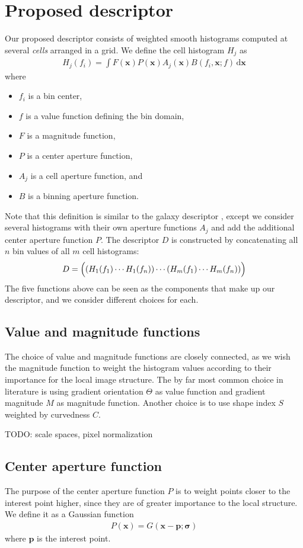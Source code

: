 \documentclass[thesis.tex]{subfiles}
\def\x{\mathbf{x}}
\def\p{\mathbf{p}}
\begin{document}
\chapter{Proposed descriptor}
%
Our proposed descriptor consists of weighted smooth histograms computed at several \textit{cells} arranged in a grid. We define the cell histogram $H_j$ as
%
\begin{align}
H_j(f_i) = \int F(\x) P (\x) A_j (\x) B(f_i, \x; f) \,\text{d} \x
\end{align}
%
where
%
\begin{itemize}
\item[] $f_i$ is a bin center,
\item[] $f$ is a value function defining the bin domain,
\item[] $F$ is a magnitude function,
\item[] $P$ is a center aperture function,
\item[] $A_j$ is a cell aperture function, and
\item[] $B$ is a binning aperture function.
\end{itemize}
%
Note that this definition is similar to the galaxy descriptor \cite{pedersen2013shape}, except we consider several histograms with their own aperture functions $A_j$ and add the additional center aperture function $P$. The descriptor $D$ is constructed by concatenating all $n$ bin values of all $m$ cell histograms:
%
\begin{align}
D = \Bigl( \left(H_1(f_1) \cdots H_1(f_n)\right) \cdots (H_m(f_1) \cdots H_m(f_n)) \Bigr)
\end{align}
%
The five functions above can be seen as the components that make up our descriptor, and we consider different choices for each.
%
\section{Value and magnitude functions}
%
The choice of value and magnitude functions are closely connected, as we wish the magnitude function to weight the histogram values according to their importance for the local image structure. The by far most common choice in literature is using gradient orientation $\Theta$ as value function and gradient magnitude $M$ as magnitude function. Another choice is to use shape index $S$ weighted by curvedness $C$.

TODO: scale spaces, pixel normalization
%
\section{Center aperture function}
%
The purpose of the center aperture function $P$ is to weight points closer to the interest point higher, since they are of greater importance to the local structure. We define it as a Gaussian function
%
\begin{align}
P(\x) = G(\x - \p; \boldsymbol{\sigma})
\end{align}
%
where $\p$ is the interest point.
%
\end{document}
